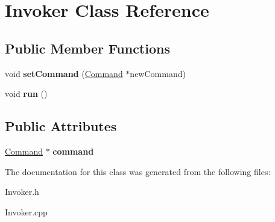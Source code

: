 \hypertarget{class_invoker}{}\section{Invoker Class Reference}
\label{class_invoker}
\subsection*{Public Member Functions}
\begin{DoxyCompactItemize}
\item 
\hypertarget{class_invoker_a85b4ed1f7a614fd301a927eea9aebd34}{}void {\bfseries set\+Command} (\hyperlink{class_command}{Command} $\ast$new\+Command)\label{class_invoker_a85b4ed1f7a614fd301a927eea9aebd34}

\item 
\hypertarget{class_invoker_abb638c8a0375ffe8b8bc36807bc34feb}{}void {\bfseries run} ()\label{class_invoker_abb638c8a0375ffe8b8bc36807bc34feb}

\end{DoxyCompactItemize}
\subsection*{Public Attributes}
\begin{DoxyCompactItemize}
\item 
\hypertarget{class_invoker_a66787cc9fe2056889d2d091bb9759892}{}\hyperlink{class_command}{Command} $\ast$ {\bfseries command}\label{class_invoker_a66787cc9fe2056889d2d091bb9759892}

\end{DoxyCompactItemize}


The documentation for this class was generated from the following files\+:\begin{DoxyCompactItemize}
\item 
Invoker.\+h\item 
Invoker.\+cpp\end{DoxyCompactItemize}
